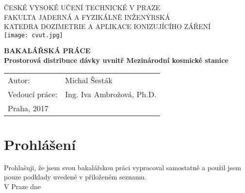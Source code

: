 \begin{center}
{\LARGE ČESKÉ VYSOKÉ UČENÍ TECHNICKÉ V PRAZE\\}
	\vspace{10pt}
{\large FAKULTA JADERNÁ A FYZIKÁLNĚ INŽENÝRSKÁ\\}
{\large KATEDRA DOZIMETRIE A APLIKACE IONIZUJÍCÍHO ZÁŘENÍ\\}
	\vspace{40pt}
    \texttt{[image: cvut.jpg]}

	\vspace{40pt}
{\Huge \textbf{BAKALÁŘSKÁ PRÁCE\\}}
	\vspace{10pt}
{\LARGE \textbf{Prostorová distribuce dávky uvnitř Mezinárodní kosmické stanice\\}}
	\vspace{150pt}

\end{center}
{\large
\begin{tabular}{p{4cm} p{8cm}}
Autor: & Michal Šesták\\
Vedoucí práce: & Ing. Iva Ambrožová, Ph.D.\\
Praha, 2017 & \\
\end{tabular}
}
%
\newpage
\vspace*{\fill}
\section*{Prohlášení}
Prohlašuji, že jsem svou bakalářskou práci vypracoval samostatně a použil jsem pouze podklady uvedené v přiloženém seznamu.\\[10pt]
V Praze dne \\[10pt]
\newpage
\vspace*{\fill}
